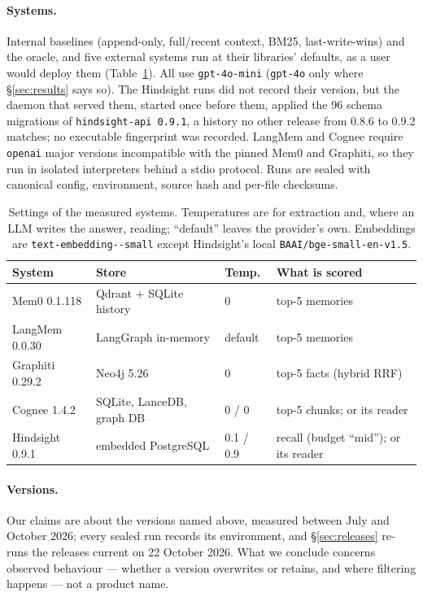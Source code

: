 \documentclass[conference]{IEEEtran}
\newcommand{\embedmodel}{\texttt{text-\allowbreak embedding-\allowbreak 3-\allowbreak small}}
\begin{document}
\paragraph{Systems.} Internal baselines (append-only, full/recent context, BM25,
last-write-wins) and the oracle, and five external systems run at their
libraries' defaults, as a user would deploy them (Table~\ref{tab:settings}).
All use \texttt{gpt-4o-mini} (\texttt{gpt-4o} only where \S\ref{sec:results}
says so). The Hindsight runs did not record their version, but the daemon that
served them, started once before them, applied the 96 schema migrations of
\texttt{hindsight-api 0.9.1}, a history no other release from 0.8.6 to 0.9.2
matches; no executable fingerprint was recorded. LangMem and
Cognee require \texttt{openai} major versions incompatible with the pinned Mem0
and Graphiti, so they run in isolated interpreters behind a stdio protocol. Runs
are sealed with canonical config, environment, source hash and per-file
checksums.

\begin{table}[t]
\centering
\caption{Settings of the measured systems. Temperatures are for extraction and,
where an LLM writes the answer, reading; ``default'' leaves the provider's own.
Embeddings are \embedmodel{} except Hindsight's local
\texttt{BAAI/bge-small-en-v1.5}.}
\label{tab:settings}
\footnotesize
\setlength{\tabcolsep}{2.5pt}
\begin{tabular}{@{}l>{\raggedright\arraybackslash}p{2.25cm}l>{\raggedright\arraybackslash}p{2.45cm}@{}}
\toprule
System & Store & Temp. & What is scored \\
\midrule
Mem0 0.1.118      & Qdrant + SQLite history     & 0 & top-5 memories \\
LangMem 0.0.30    & LangGraph in-memory         & default & top-5 memories \\
Graphiti 0.29.2   & Neo4j 5.26                  & 0 & top-5 facts (hybrid RRF) \\
Cognee 1.4.2      & SQLite, LanceDB, graph DB   & 0 / 0 & top-5 chunks; or its reader \\
Hindsight 0.9.1   & embedded PostgreSQL         & 0.1 / 0.9 & recall (budget ``mid''); or its reader \\
\bottomrule
\end{tabular}
\end{table}

\paragraph{Versions.} Our claims are about the versions named above, measured
between July and October 2026; every sealed run records its environment, and
\S\ref{sec:releases} re-runs the releases current on 22 October 2026. What we
conclude concerns observed behaviour --- whether a version overwrites or
retains, and where filtering happens --- not a product name.
\end{document}
